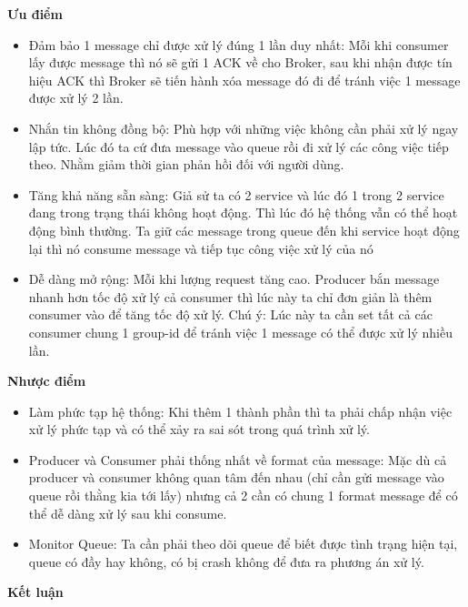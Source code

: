             \textbf{Ưu điểm}
            
            \begin{itemize}
                \item Đảm bảo 1 message chỉ được xử lý đúng 1 lần duy nhất: Mỗi khi consumer lấy được message thì nó sẽ gửi 1 ACK về cho Broker, sau khi nhận được tín hiệu ACK thì Broker sẽ tiến hành xóa message đó đi để tránh việc 1 message được xử lý 2 lần.
                \item Nhắn tin không đồng bộ: Phù hợp với những việc không cần phải xử lý ngay lập tức. Lúc đó ta cứ đưa message vào queue rồi đi xử lý các công việc tiếp theo. Nhằm giảm thời gian phản hồi đối với người dùng.
                \item Tăng khả năng sẵn sàng: Giả sử ta có 2 service và lúc đó 1 trong 2 service đang trong trạng thái không hoạt động. Thì lúc đó hệ thống vẫn có thể hoạt động bình thường. Ta giữ các message trong queue đến khi service hoạt động lại thì nó consume message và tiếp tục công việc xử lý của nó
                \item Dễ dàng mở rộng: Mỗi khi lượng request tăng cao. Producer bắn message nhanh hơn tốc độ xử lý cả consumer thì lúc này ta chỉ đơn giản là thêm consumer vào để tăng tốc độ xử lý. Chú ý: Lúc này ta cần set tất cả các consumer chung 1 group-id để tránh việc 1 message có thể được xử lý nhiều lần.
            \end{itemize}
            
            \textbf{Nhược điểm}
            
            \begin{itemize}
                \item Làm phức tạp hệ thống: Khi thêm 1 thành phần thì ta phải chấp nhận việc xử lý phức tạp và có thể xảy ra sai sót trong quá trình xử lý.
                \item Producer và Consumer phải thống nhất về format của message: Mặc dù cả producer và consumer không quan tâm đến nhau (chỉ cần gửi message vào queue rồi thằng kia tới lấy) nhưng cả 2 cần có chung 1 format message để có thể dễ dàng xử lý sau khi consume.
                \item Monitor Queue: Ta cần phải theo dõi queue để biết được tình trạng hiện tại, queue có đầy hay không, có bị crash không để đưa ra phương án xử lý.
            \end{itemize}
            
            \textbf{Kết luận}\\
            
